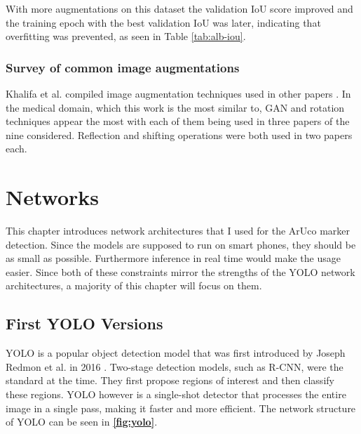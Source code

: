\documentclass[10pt]{book}
\newcommand{\figureref}[1]{\textbf{\autoref{#1}}}
\begin{document}
With more augmentations on this dataset the validation \ac{IoU} score improved and the training epoch with the best validation \ac{IoU} was later, indicating that overfitting was prevented, as seen in Table \ref{tab:alb-iou}.

\subsection{Survey of common image augmentations}

Khalifa et al. compiled image augmentation techniques used in other papers \cite{khalifa2022comprehensive}. In the medical domain, which this work is the most similar to, \ac{GAN} and rotation techniques appear the most with each of them being used in three papers of the nine considered. Reflection and shifting operations were both used in two papers each.

\chapter{Networks}
\label{chap:netw}

This chapter introduces network architectures that I used for the \ac{ArUco} marker detection. Since the models are supposed to run on smart phones, they should be as small as possible. Furthermore inference in real time would make the usage easier. Since both of these constraints mirror the strengths of the \ac{YOLO} network architectures, a majority of this chapter will focus on them.

\section{First YOLO Versions}

\ac{YOLO} is a popular object detection model that was first introduced by Joseph Redmon et al. in 2016 \cite{redmon2016you}. Two-stage detection models, such as R-CNN, were the standard at the time. They first propose regions of interest and then classify these regions. \ac{YOLO} however is a single-shot detector that processes the entire image in a single pass, making it faster and more efficient. The network structure of \ac{YOLO} can be seen in \figureref{fig:yolo}.
\end{document}
